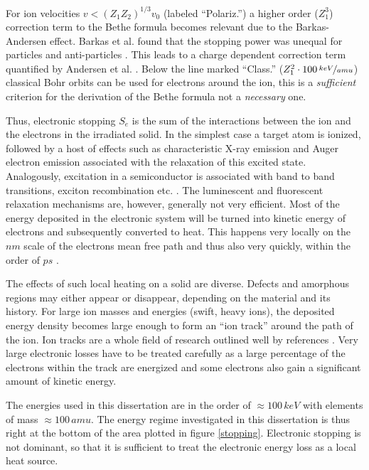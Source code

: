 For ion velocities $v < (Z_1Z_2)^{1/3}v_0$ (labeled ``Polariz.'') a higher order ($Z_1^3$) correction term to the Bethe formula becomes relevant due to the Barkas-Andersen effect. Barkas et al. found that the stopping power was unequal for particles and anti-particles \cite{smith_measurements_1953}. This leads to a charge dependent correction term quantified by Andersen et al. \cite{andersen_experimental_1969,sigmund_notes_2014}. Below the line marked ``Class.'' ($Z_1^2\cdot 100\,\nicefrac{keV}{amu}$) classical Bohr orbits can be used for electrons around the ion, this is a \emph{sufficient} criterion for the derivation of the Bethe formula not a \emph{necessary} one.

Thus, electronic stopping $S_e$ is the sum of the interactions between the ion and the electrons in the irradiated solid. In the simplest case a target atom is ionized, followed by a host of effects such as characteristic X-ray emission and Auger electron emission associated with the relaxation of this excited state. Analogously, excitation in a semiconductor is associated with band to band transitions, exciton recombination etc. \cite{wiedemann_uber_1888}. The luminescent and fluorescent relaxation mechanisms are, however, generally not very efficient. Most of the energy deposited in the electronic system will be turned into kinetic energy of electrons and subsequently converted to heat. This happens very locally on the $nm$ scale of the electrons mean free path and thus also very quickly, within the order of $ps$ \cite{nastasi/mayer/hirvonen_ion-solid_2008}. 


The effects of such local heating on a solid are diverse. Defects and amorphous regions may either appear or disappear, depending on the material and its history. For large ion masses and energies (swift, heavy ions), the deposited energy density becomes large enough to form an ``ion track'' around the path of the ion. Ion tracks are a whole field of research outlined well by references \cite{toulemonde_transient_1992,miotello_revisiting_1997,wesch_effect_2004}. Very large electronic losses have to be treated carefully as a large percentage of the electrons within the track are energized and some electrons also gain a significant amount of kinetic energy. 

The energies used in this dissertation are in the order of $\approx 100\,keV$ with elements of mass $\approx 100\,amu$. The energy regime investigated in this dissertation is thus right at the bottom of the area plotted in figure \ref{stopping}. Electronic stopping is not dominant, so that it is sufficient to treat the electronic energy loss as a local heat source.

